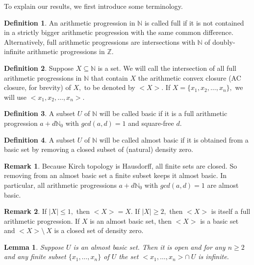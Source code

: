 \documentclass[10pt]{article}
\newtheorem{lemma}[theorem]{Lemma}
\theoremstyle{definition}
\newtheorem{definition}{Definition}
\newtheorem{remark}{Remark}
\begin{document}
To explain our results, we first introduce some terminology.

\begin{definition} An arithmetic progression in $\mathbb N$ is called full if it is not contained in a strictly bigger arithmetic progression with the same common difference. Alternatively, full arithmetic progressions are intersections with $\mathbb N$ of doubly-infinite arithmetic progressions in $\mathbb Z.$
\end{definition}

\begin{definition}Suppose $X\subseteq \mathbb N$ is a set.  We will call the intersection of all full arithmetic progressions in $\mathbb N$ that contain $X$ the arithmetic convex closure (AC closure, for brevity) of $X,$ to be denoted by $<X>$.  If $X=\{x_1,x_2,\dots , x_n\},$ we will use $<x_1, x_2,\dots , x_n>.$
\end{definition}

\begin{definition} A subset $U$ of $\mathbb N$ will be called basic if it is a full arithmetic progression $a+d\mathbb N_0$ with $gcd(a,d) =1$ and square-free $d$.
\end{definition}

\begin{definition} A subset $U$ of $\mathbb N$ will be called almost basic if it is obtained from a basic set by removing a closed subset of (natural) density zero.
\end{definition}

\begin{remark} Because Kirch topology is Hausdorff, all finite sets are closed. So removing from an almost basic set a finite subset keeps it almost basic. In particular, all arithmetic progressions $a+d\mathbb N_0$ with $gcd(a,d) =1$ are almost basic.
\end{remark}

\begin{remark} If $|X|\leq 1 ,$ then $<X>= X.$ If $|X|\geq 2,$ then $<X>$ is itself a full arithmetic progression. If $X$ is an almost basic set, then $<X>$ is a basic set and $<X>\setminus \ X$ is a closed set of density zero.
\end{remark}

\begin{lemma} Suppose $U$ is an almost basic set. Then it is open and for any $n\geq 2$ and any finite subset $\{x_1,\dots ,x_n\}$ of $U$ the set $<x_1,\dots,x_n>\cap \ U$ is infinite.
\end{lemma}
\end{document}
